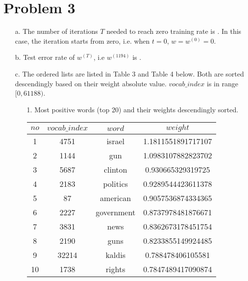 \documentclass[twoside]{homework}
\begin{document}
\section*{Problem 3}
\begin{itemize}
    \item [a.] The number of iterations $T$ needed to reach zero training rate is . In this case, the iteration starts from zero, i.e. when $t=0$, $w=w^{(0)}=0$.
    \item [b.] Test error rate of $w^{(T)}$, i.e $w^{(1194)}$ is .
    \item [c.] The ordered lists are listed in Table 3 and Table 4 below. Both are sorted descendingly based on their weight absolute value.  $vocab\_index$ is in range $[0, 61188)$.
        \begin{itemize}
            \item [1.] Most positive words (top 20) and their weights descendingly sorted.
            \begin{table}[h!]
                \centering
                \begin{tabular}{||c c c c||}
                    \hline
                    $no$ & $vocab\_index$ & $word$ & $weight$ \\ [1ex]
                    \hline\hline
                    1 & 4751 & israel & 1.1811551891717107\\
                    \hline
                    2 & 1144 & gun & 1.0983107882823702\\
                    \hline
                    3 & 5687 & clinton & 0.930665329319725\\
                    \hline
                    4 & 2183 & politics & 0.9289544423611378\\
                    \hline
                    5 & 87 & american & 0.9057536874334365\\
                    \hline
                    6 & 2227 & government & 0.8737978481876671\\
                    \hline
                    7 & 3831 & news & 0.8362673178451754\\
                    \hline
                    8 & 2190 & guns & 0.8233855149924485\\
                    \hline
                    9 & 32214 & kaldis & 0.788478406105581\\
                    \hline
                    10 & 1738 & rights & 0.7847489417090874\\

\end{tabular}
\end{table}
\end{itemize}
\end{itemize}
\end{document}
